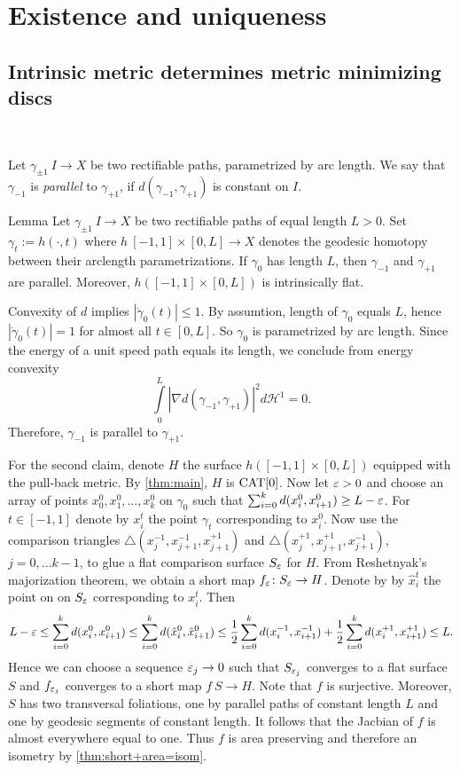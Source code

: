 \documentclass[a4paper,10pt]{amsart}
\begin{document}
\section{Existence and uniqueness}




\subsection{Intrinsic metric determines metric minimizing discs}~

\medskip
Let $\gamma_{\pm 1}\:I\to X$ be two rectifiable paths, parametrized by arc length. We say that  $\gamma_{-1}$ is {\em parallel} to $\gamma_{+1}$, if $d(\gamma_{-1},\gamma_{+1})$
is constant on $I$.


\begin{thm}{Lemma}\label{lem:parpaths}
Let $\gamma_{\pm 1}\:I\to X$ be two rectifiable paths of equal length $L>0$. Set $\gamma_t:=h(\cdot,t)$ where $h\:[-1,1]\times[0,L]\to X$ denotes the geodesic homotopy
between their arclength parametrizations. If $\gamma_0$ has length $L$, then $\gamma_{-1}$ and $\gamma_{+1}$ are parallel. Moreover, $h([-1,1]\times[0,L])$ is intrinsically 
flat.
\end{thm}
Convexity of $d$ implies $|\dot\gamma_0(t)|\leq 1$. By assumtion, length of $\gamma_0$ equals $L$, hence $|\dot\gamma_0(t)|=1$ for almost all $t\in[0,L]$. So $\gamma_0$
is parametrized by arc length. Since the energy of a unit speed path equals its length, we conclude from energy convexity 
$$
\int\limits_0^L|\nabla d(\gamma_{-1},\gamma_{+1})|^2 d\mathcal{H}^1
=
0.
$$
Therefore, $\gamma_{-1}$ is parallel to $\gamma_{+1}$.

For the second claim, denote $H$ the surface $h([-1,1]\times[0,L])$ equipped with the pull-back metric. By \ref{thm:main}, $H$
is $\mathop{\rm CAT}\nolimits[0]$.
Now let $\varepsilon>0$ and choose an array of points $x_0^{0},x_1^{0},\ldots,x_k^{0}$ on $\gamma_{0}$ 
such that $\sum_{i=0}^k d(x_i^{0},x_{i+1}^{0})\geq L-\varepsilon$. For $t\in[-1,1]$ denote by $x_i^{t}$ the
point $\gamma_t$ corresponding to $x_i^{0}$. Now use the comparison triangles
$\triangle(x_{j}^{-1},x_{j+1}^{-1},x_{j+1}^{+1})$ and $\triangle(x_{j}^{+1},x_{j+1}^{+1},x_{j+1}^{-1})$, $j=0,\ldots k-1$,
to glue a flat comparison surface $S_\varepsilon$ for $H$. From Reshetnyak's majorization theorem, we obtain a short map 
$f_\varepsilon\colon S_\varepsilon\to H$. Denote by by $\hat x_i^{t}$ the point on on $S_\varepsilon$ corresponding to $x_i^{t}$. Then
$$
L-\varepsilon\leq\sum_{i=0}^k d(x_i^{0},x_{i+1}^{0})\leq\sum_{i=0}^k d(\hat x_i^{0},\hat x_{i+1}^{0})\leq
\frac{1}{2}\sum_{i=0}^k d(x_i^{-1}, x_{i+1}^{-1})+\frac{1}{2}\sum_{i=0}^k d(x_i^{+1}, x_{i+1}^{+1})\leq L.
$$
Hence we can choose a sequence $\varepsilon_j\to 0$ such that $S_{\varepsilon_j}$ converges to a flat surface $S$ and $f_{\varepsilon_j}$
converges to a short map $f\:S\to H$. Note that $f$ is surjective. Moreover, $S$
has two transversal foliations, one by parallel paths of constant length $L$ and one by geodesic segments of constant length.
It follows that the Jacbian of $f$ is almost everywhere equal to one. Thus $f$ is area preserving and therefore an isometry by \ref{thm:short+area=isom}.
\qeds
\end{document}
